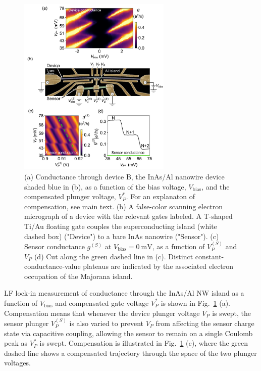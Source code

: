 \begin{figure}
	\includegraphics[width=0.65\textwidth]{Fig3-12.pdf}
	\caption[Charge sensing of a superconducting island]{(a) Conductance through device B, the InAs/Al nanowire device shaded blue in (b), as a function of the bias voltage, $V_\textrm{bias}$, and the compensated plunger voltage, $V_{P}^{*}$. For an explanaton of compensation, see main text. (b) A false-color scanning electron micrograph of a device with the relevant gates labeled. A T-shaped Ti/Au floating gate couples the superconducting island (white dashed box) ("Device") to a bare InAs nanowire ("Sensor"). (c) Sensor conductance $g^{(S)}$ at $V_\textrm{bias} = \SI{0}{\milli\volt}$, as a function of $V_{P}^{(S)}$ and $V_{P}$ (d) Cut along the green dashed line in (c). Distinct constant-conductance-value plateaus are indicated by the associated electron occupation  of the Majorana island.}
	\label{fig:majo_c}
\end{figure}

LF lock-in  measurement of conductance through the InAs/Al NW island as a function of $V_\textrm{bias}$ and compensated gate voltage $V_{P}^{*}$ is shown in Fig.~\ref{fig:majo_c} (a). Compensation means that whenever the device plunger voltage $V_{P}$ is swept, the sensor plunger $V_{P}^{(S)}$ is also varied to prevent $V_{P}$ from affecting the sensor charge state via capacitive coupling, allowing the sensor to remain on a single Coulomb peak as $V_{P}^{*}$ is swept. Compensation is illustrated in Fig.~\ref{fig:majo_c} (c), where the green dashed line shows a compensated trajectory through the space of the two plunger voltages.

